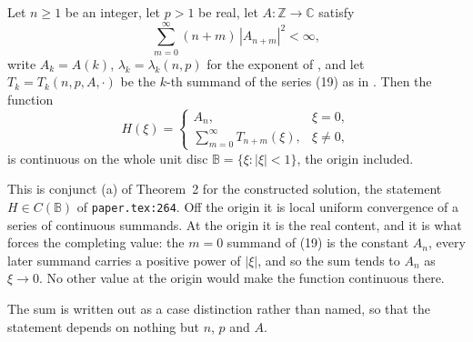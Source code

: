\begin{helper}
Let $n\ge1$ be an integer, let $p>1$ be real, let $A\colon\mathbb{Z}\to\mathbb{C}$
satisfy
\[
  \sum_{m=0}^\infty(n+m)\,|A_{n+m}|^2<\infty ,
\]
write $A_k=A(k)$, $\lambda_k=\lambda_k(n,p)$ for the exponent of
, and let $T_k=T_k(n,p,A,\cdot)$ be the $k$-th summand of
the series (19) as in .  Then the function
\[
  H(\xi)=\begin{cases}A_n,&\xi=0,\\[2pt]
    \displaystyle\sum_{m=0}^\infty T_{n+m}(\xi),&\xi\ne0,\end{cases}
\]
is continuous on the whole unit disc $\mathbb{B}=\{\xi:|\xi|<1\}$, the origin
included.

This is conjunct (a) of Theorem~2 for the constructed solution, the statement
$H\in C(\mathbb{B})$ of \texttt{paper.tex:264}.  Off the origin it is local
uniform convergence of a series of continuous summands.  At the origin it is
the real content, and it is what forces the completing value: the $m=0$
summand of (19) is the constant $A_n$, every later summand carries a positive
power of $|\xi|$, and so the sum tends to $A_n$ as $\xi\to0$.  No other value
at the origin would make the function continuous there.

The sum is written out as a case distinction rather than named, so that the
statement depends on nothing but $n$, $p$ and $A$.
\end{helper}
